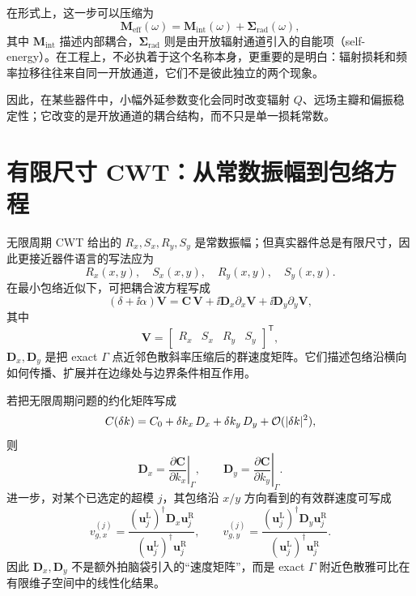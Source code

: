 在形式上，这一步可以压缩为
\begin{equation}
\mathbf{M}_{\mathrm{eff}}(\omega)
=
\mathbf{M}_{\mathrm{int}}(\omega)
+
\mathbf{\Sigma}_{\mathrm{rad}}(\omega),
\label{eq:3dcwt_selfenergy}
\end{equation}
其中 $\mathbf{M}_{\mathrm{int}}$ 描述内部耦合，$\mathbf{\Sigma}_{\mathrm{rad}}$ 则是由开放辐射通道引入的自能项（self-energy）。在工程上，不必执着于这个名称本身，更重要的是明白：辐射损耗和频率拉移往往来自同一开放通道，它们不是彼此独立的两个现象。

因此，在某些器件中，小幅外延参数变化会同时改变辐射 $Q$、远场主瓣和偏振稳定性；它改变的是开放通道的耦合结构，而不只是单一损耗常数。

\section{有限尺寸 CWT：从常数振幅到包络方程}
无限周期 CWT 给出的 $R_x,S_x,R_y,S_y$ 是常数振幅；但真实器件总是有限尺寸，因此更接近器件语言的写法应为
\begin{equation}
  R_x(x,y),\quad S_x(x,y),\quad R_y(x,y),\quad S_y(x,y).
\end{equation}
在最小包络近似下，可把耦合波方程写成
\begin{equation}
  (\delta+\ii\alpha)\bm V
  =
  \bm C\,\bm V
  +
  \ii \bm D_x \partial_x \bm V
  +
  \ii \bm D_y \partial_y \bm V,
\label{eq:finite_size_cwt_envelope}
\end{equation}
其中
\begin{equation}
  \bm V=
  \begin{bmatrix}
    R_x & S_x & R_y & S_y
  \end{bmatrix}^{\mathsf T},
\end{equation}
$\bm D_x,\bm D_y$ 是把 exact $\Gamma$ 点近邻色散斜率压缩后的群速度矩阵。它们描述包络沿横向如何传播、扩展并在边缘处与边界条件相互作用。

若把无限周期问题的约化矩阵写成
\begin{equation}
C(\delta k)
=
C_0
+ \delta k_x\,D_x
+ \delta k_y\,D_y
+ \mathcal O(|\delta k|^2),
\label{eq:finite_cwt_linearized_C}
\end{equation}
则
\begin{equation}
\bm D_x=\left.\frac{\partial \bm C}{\partial k_x}\right|_{\Gamma},
\qquad
\bm D_y=\left.\frac{\partial \bm C}{\partial k_y}\right|_{\Gamma}.
\label{eq:finite_cwt_D_matrix_def}
\end{equation}
进一步，对某个已选定的超模 $j$，其包络沿 $x/y$ 方向看到的有效群速度可写成
\begin{equation}
v_{g,x}^{(j)}
=
\frac{(\bm u_j^{\mathrm L})^\dagger \bm D_x \bm u_j^{\mathrm R}}
     {(\bm u_j^{\mathrm L})^\dagger \bm u_j^{\mathrm R}},
\qquad
v_{g,y}^{(j)}
=
\frac{(\bm u_j^{\mathrm L})^\dagger \bm D_y \bm u_j^{\mathrm R}}
     {(\bm u_j^{\mathrm L})^\dagger \bm u_j^{\mathrm R}}.
\label{eq:finite_cwt_group_velocity_projection}
\end{equation}
因此 $\bm D_x,\bm D_y$ 不是额外拍脑袋引入的“速度矩阵”，而是 exact $\Gamma$
附近色散雅可比在有限维子空间中的线性化结果。

